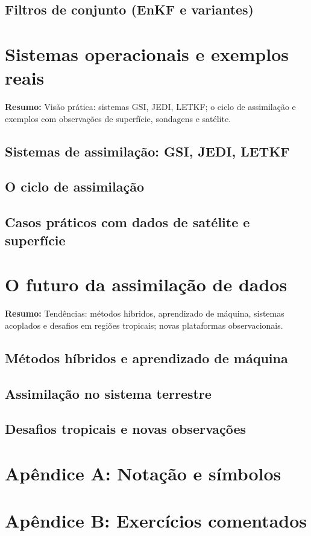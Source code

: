 \documentclass[12pt,a4paper,oneside]{book}
\begin{document}
\section{Filtros de conjunto (EnKF e variantes)}

\chapter{Sistemas operacionais e exemplos reais}
\noindent\textbf{Resumo:} Visão prática: sistemas GSI, JEDI, LETKF; o ciclo de assimilação e exemplos com observações de superfície, sondagens e satélite.
\section{Sistemas de assimilação: GSI, JEDI, LETKF}
\section{O ciclo de assimilação}
\section{Casos práticos com dados de satélite e superfície}

\chapter{O futuro da assimilação de dados}
\noindent\textbf{Resumo:} Tendências: métodos híbridos, aprendizado de máquina, sistemas acoplados e desafios em regiões tropicais; novas plataformas observacionais.
\section{Métodos híbridos e aprendizado de máquina}
\section{Assimilação no sistema terrestre}
\section{Desafios tropicais e novas observações}

\backmatter

\printglossary[type=\acronymtype,title={Lista de Siglas}]
\printglossary[title={Glossário}]

\printbibliography[title={Referências}]

\printindex

\appendix
\chapter{Apêndice A: Notação e símbolos}
\chapter{Apêndice B: Exercícios comentados}
\end{document}
